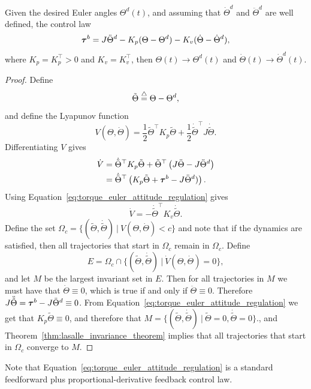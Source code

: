 \begin{theorem}\label{thm:euler_attitude_stabilization}
	Given the desired Euler angles $\Theta^d(t)$, and assuming that $\dot{\Theta}^d$ and $\ddot{\Theta}^d$ are well defined, the control law
	\begin{equation}\label{eq:torque_euler_attitude_regulation}
	\taubf^b = J\ddot{\Theta}^d - K_p (\Theta-\Theta^d) - K_v (\dot{\Theta}-\dot{\Theta}^d),
	\end{equation}
	where $K_p=K_p^\top >0$ and $K_v=K_v^\top$, then $\Theta(t)\to\Theta^d(t)$ and $\dot{\Theta}(t)\to\dot{\Theta}^d(t)$.
\end{theorem}
\begin{proof}
Define
\[
\tilde{\Theta} \stackrel{\triangle}{=} \Theta - \Theta^d,
\]
and define the Lyapunov function
\[
V(\Theta, \dot{\Theta}) = \frac{1}{2}\tilde{\Theta}^\top K_p \tilde{\Theta} + \frac{1}{2}\dot{\tilde{\Theta}}^\top J \dot{\tilde{\Theta}}.
\]
Differentiating $V$ gives
\begin{align*}
\dot{V} &= \dot{\tilde{\Theta}}^\top K_p	 \tilde{\Theta} + \tilde{\Theta}^\top \left( J\ddot{\Theta} - J\ddot{\Theta}^d\right) \\
	&= \dot{\tilde{\Theta}}^\top \left( K_p	 \tilde{\Theta} + \boldsymbol{\tau}^b - J\ddot{\Theta}^d) \right).
\end{align*}
Using Equation~\eqref{eq:torque_euler_attitude_regulation} gives
\[
\dot{V} = -\dot{\tilde{\Theta}}^\top K_v \dot{\tilde{\Theta}}.
\]
Define the set $\Omega_c = \{ (\tilde{\Theta},\dot{\tilde{\Theta}}) ~|~ V(\Theta,\dot{\Theta}) < c\}$ and note that if the dynamics are satisfied, then all trajectories that start in $\Omega_c$ remain in $\Omega_c$.  Define
\[
E = \Omega_c \cap \{ (\tilde{\Theta}, \dot{\tilde{\Theta}}) ~|~ \dot{V}(\Theta, \dot{\Theta}) = 0 \},
\]
and let $M$ be the largest invariant set in $E$.  Then for all trajectories in $M$ we must have that $\dot{\Theta}\equiv 0$, which is true if and only if $\ddot{\Theta}\equiv 0$.  Therefore $J\ddot{\tilde{\Theta}} = \boldsymbol{\tau}^b - J\ddot{\Theta}^d \equiv 0$.  From Equation~\eqref{eq:torque_euler_attitude_regulation} we get that $K_p\tilde{\Theta}\equiv 0$, and therefore that $M = \{(\tilde{\Theta}, \dot{\tilde{\Theta}}) ~|~ \tilde{\Theta} = 0, \dot{\tilde{\Theta}}=0 \}.$, and Theorem~\ref{thm:lasalle_invariance_theorem} implies that all trajectories that start in $\Omega_c$ converge to $M$.
\end{proof}

Note that Equation~\eqref{eq:torque_euler_attitude_regulation} is a standard feedforward plus proportional-derivative feedback control law.  

